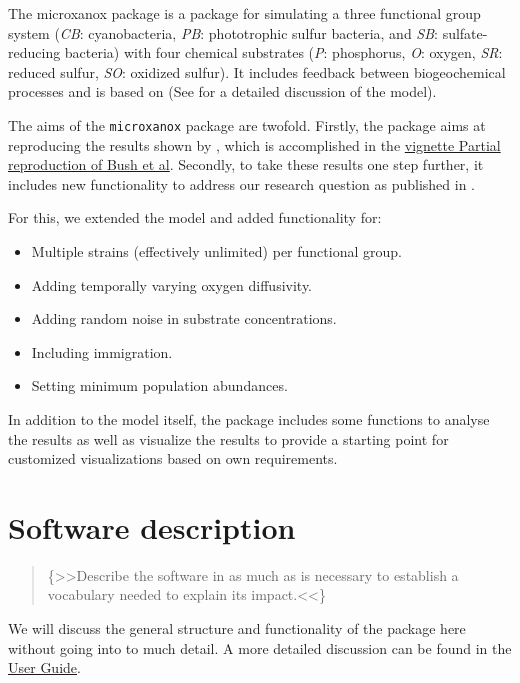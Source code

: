 \documentclass[]{elsarticle} %
\providecommand{\tightlist}{%
  \setlength{\itemsep}{0pt}\setlength{\parskip}{0pt}}
\begin{document}
The microxanox package is a package for simulating a three functional
group system (\emph{CB}: cyanobacteria, \emph{PB}: phototrophic sulfur
bacteria, and \emph{SB}: sulfate-reducing bacteria) with four chemical
substrates (\emph{P}: phosphorus, \emph{O}: oxygen, \emph{SR}: reduced
sulfur, \emph{SO}: oxidized sulfur). It includes feedback between
biogeochemical processes and is based on \citep{Bush2017} (See
\citep{Bush2017} for a detailed discussion of the model).

The aims of the \texttt{microxanox} package are twofold. Firstly, the
package aims at reproducing the results shown by \citep{Bush2017}, which
is accomplished in the \href{LINK\%20NEEDED}{vignette Partial
reproduction of Bush et al}. Secondly, to take these results one step
further, it includes new functionality to address our research question
as published in \citep{REF_NEEDED}.

For this, we extended the model and added functionality for:

\begin{itemize}
\tightlist
\item
  Multiple strains (effectively unlimited) per functional group.
\item
  Adding temporally varying oxygen diffusivity.
\item
  Adding random noise in substrate concentrations.
\item
  Including immigration.
\item
  Setting minimum population abundances.
\end{itemize}

In addition to the model itself, the package includes some functions to
analyse the results as well as visualize the results to provide a
starting point for customized visualizations based on own requirements.

\hypertarget{software-description}{%
\section{Software description}\label{software-description}}

\begin{quote}
\{\textgreater\textgreater Describe the software in as much as is
necessary to establish a vocabulary needed to explain its
impact.\textless\textless\}
\end{quote}

We will discuss the general structure and functionality of the package
here without going into to much detail. A more detailed discussion can
be found in the \href{LINK_NEEDED}{User Guide}.
\end{document}
